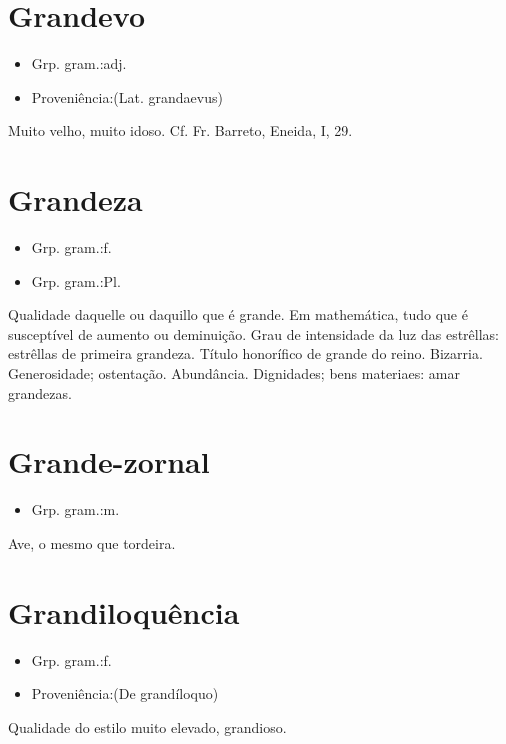 \section{Grandevo}
\begin{itemize}
\item {Grp. gram.:adj.}
\end{itemize}
\begin{itemize}
\item {Proveniência:(Lat. \textunderscore grandaevus\textunderscore )}
\end{itemize}
Muito velho, muito idoso. Cf. Fr. Barreto, \textunderscore Eneida\textunderscore , I, 29.
\section{Grandeza}
\begin{itemize}
\item {Grp. gram.:f.}
\end{itemize}
\begin{itemize}
\item {Grp. gram.:Pl.}
\end{itemize}
Qualidade daquelle ou daquillo que é grande.
Em mathemática, tudo que é susceptível de aumento ou deminuição.
Grau de intensidade da luz das estrêllas: \textunderscore estrêllas de primeira grandeza\textunderscore .
Título honorífico de grande do reino.
Bizarria.
Generosidade; ostentação.
Abundância.
Dignidades; bens materiaes: \textunderscore amar grandezas\textunderscore .
\section{Grande-zornal}
\begin{itemize}
\item {Grp. gram.:m.}
\end{itemize}
Ave, o mesmo que \textunderscore tordeira\textunderscore .
\section{Grandiloquência}
\begin{itemize}
\item {Grp. gram.:f.}
\end{itemize}
\begin{itemize}
\item {Proveniência:(De \textunderscore grandíloquo\textunderscore )}
\end{itemize}
Qualidade do estilo muito elevado, grandioso.
